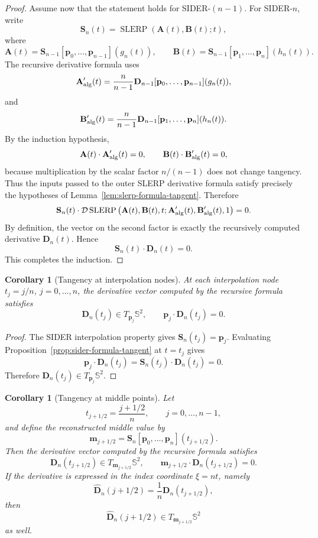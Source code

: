 \documentclass[a4paper,11pt]{article}
\newcommand{\bp}{\mathbf{p}}
\newcommand{\bD}{\mathbf{D}}
\numberwithin{equation}{section}
\theoremstyle{plain}
\newtheorem{corollary}[thm]{Corollary}
\theoremstyle{definition}
\theoremstyle{remark}
\newcommand{\slerp}{\operatorname{SLERP}}
\begin{document}
\begin{proof}
Assume now that the statement holds for SIDER-\((n-1)\).  For SIDER-\(n\), write
\[
        \mathbf{S}_n(t)=\slerp(\mathbf{A}(t),\mathbf{B}(t);t),
\]
where
\[
        \mathbf{A}(t)
        =
        \mathbf{S}_{n-1}[\bp_0,\ldots,\bp_{n-1}](g_n(t)),
        \qquad
        \mathbf{B}(t)
        =
        \mathbf{S}_{n-1}[\bp_1,\ldots,\bp_n](h_n(t)).
\]
The recursive derivative formula uses
\[
        \mathbf{A}'_{\rm alg}(t)
        =
        \frac{n}{n-1}
        \bD_{n-1}[\bp_0,\ldots,\bp_{n-1}](g_n(t)),
\]
and
\[
        \mathbf{B}'_{\rm alg}(t)
        =
        \frac{n}{n-1}
        \bD_{n-1}[\bp_1,\ldots,\bp_n](h_n(t)).
\]
By the induction hypothesis,
\[
        \mathbf{A}(t)\cdot \mathbf{A}'_{\rm alg}(t)=0,
        \qquad
        \mathbf{B}(t)\cdot \mathbf{B}'_{\rm alg}(t)=0,
\]
because multiplication by the scalar factor \(n/(n-1)\) does not change tangency.  Thus the inputs passed to the outer SLERP derivative formula satisfy precisely the hypotheses of Lemma~\ref{lem:slerp-formula-tangent}.  Therefore
\[
        \mathbf{S}_n(t)\cdot
        \mathcal{D}\slerp
        \left(
        \mathbf{A}(t),\mathbf{B}(t),t;
        \mathbf{A}'_{\rm alg}(t),\mathbf{B}'_{\rm alg}(t),1
        \right)
        =
        0 .
\]
By definition, the vector on the second factor is exactly the recursively computed derivative \(\bD_n(t)\).  Hence
\[
        \mathbf{S}_n(t)\cdot\bD_n(t)=0 .
\]
This completes the induction.
\end{proof}

\begin{corollary}[Tangency at interpolation nodes]\label{cor:sampling-point-tangent}
At each interpolation node \(t_j=j/n\), \(j=0,\ldots,n\), the derivative vector computed by the recursive formula satisfies
\[
        \bD_n(t_j)\in T_{\bp_j}\mathbb{S}^2,
        \qquad
        \bp_j\cdot\bD_n(t_j)=0 .
\]
\end{corollary}

\begin{proof}
The SIDER interpolation property gives \(\mathbf{S}_n(t_j)=\bp_j\).  Evaluating Proposition~\ref{prop:sider-formula-tangent} at \(t=t_j\) gives
\[
        \bp_j\cdot\bD_n(t_j)
        =
        \mathbf{S}_n(t_j)\cdot\bD_n(t_j)
        =
        0 .
\]
Therefore \(\bD_n(t_j)\in T_{\bp_j}\mathbb{S}^2\).
\end{proof}

\begin{corollary}[Tangency at middle points]\label{cor:middle-point-tangent}
Let
\[
        t_{j+1/2}=\frac{j+1/2}{n},
        \qquad
        j=0,\ldots,n-1,
\]
and define the reconstructed middle value by
\[
        \mathbf{m}_{j+1/2}
        =
        \mathbf{S}_n[\bp_0,\ldots,\bp_n](t_{j+1/2}) .
\]
Then the derivative vector computed by the recursive formula satisfies
\[
        \bD_n(t_{j+1/2})\in T_{\mathbf{m}_{j+1/2}}\mathbb{S}^2,
        \qquad
        \mathbf{m}_{j+1/2}\cdot\bD_n(t_{j+1/2})=0 .
\]
If the derivative is expressed in the index coordinate \(\xi=nt\), namely
\[
        \widehat{\bD}_n(j+1/2)
        =
        \frac{1}{n}\bD_n(t_{j+1/2}),
\]
then
\[
        \widehat{\bD}_n(j+1/2)\in T_{\mathbf{m}_{j+1/2}}\mathbb{S}^2
\]
as well.
\end{corollary}
\end{document}
